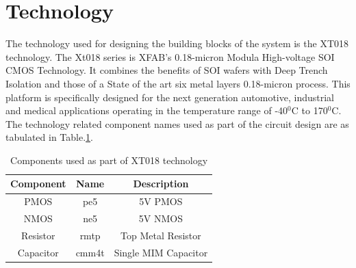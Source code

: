 \vfill
\clearpage

\section{Technology}

The technology used for designing the building blocks of the system is the XT018 technology. The Xt018 series is XFAB's 0.18-micron Modula High-voltage SOI CMOS Technology. It combines the benefits of SOI wafers with Deep Trench Isolation and those of a State of the art six metal layers 0.18-micron process. This platform is specifically designed for the next generation automotive, industrial and medical applications operating in the temperature range of -40$^0$C to 170$^0$C. The technology related component names used as part of the circuit design are as tabulated in Table.\ref{tab:Components}.

\begin{table} [H]
\centering
\begin{tabular}{@{}ccc@{}}
\toprule
Component	& Name		& Description			\\ \midrule
PMOS		& pe5		& 5V PMOS				\\
NMOS		& ne5		& 5V NMOS				\\
Resistor	& rmtp		& Top Metal Resistor	\\
Capacitor	& cmm4t		& Single MIM Capacitor	\\
\bottomrule
\end{tabular}
\caption{Components used as part of XT018 technology}
\label{tab:Components}
\end{table}










